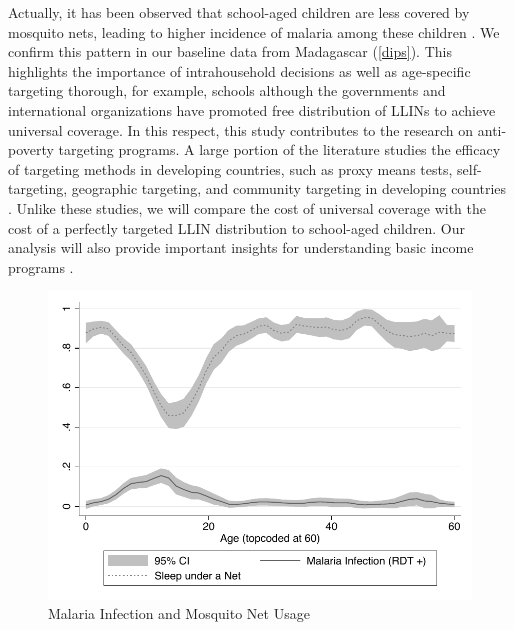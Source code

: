 \documentclass[fleqn,11pt]{article}
\begin{document}
Actually, it has been observed that school-aged children are less covered by mosquito nets, leading to higher incidence of malaria among these children \citep{noor_use_2009}. We confirm this pattern in our baseline data from Madagascar (\autoref{dips}). This highlights the importance of intrahousehold decisions as well as age-specific targeting thorough, for example, schools although the governments and international organizations have promoted free distribution of LLINs to achieve universal coverage. In this respect, this study contributes to the research on anti-poverty targeting programs. A large portion of the literature studies the efficacy of targeting methods in developing countries, such as proxy means tests, self-targeting, geographic targeting, and community targeting in developing countries \citep{nichols_targeting_1982,coady_targeting_2004,elbers_poverty_2007,ravallion_how_2009,alatas_targeting_2012,brown_poor_2016}. Unlike these studies, we will compare the cost of universal coverage with the cost of a perfectly targeted LLIN distribution to school-aged children. Our analysis will also provide important insights for understanding basic income programs \citep{ravallion_vox,hanna_universal_2018,banerjee_universal_2019}.





\begin{figure}[h]
\centering
\includegraphics[scale=0.7]{dips.pdf}
\caption{Malaria Infection and Mosquito Net Usage}
\label{dips}
\end{figure}
\end{document}
